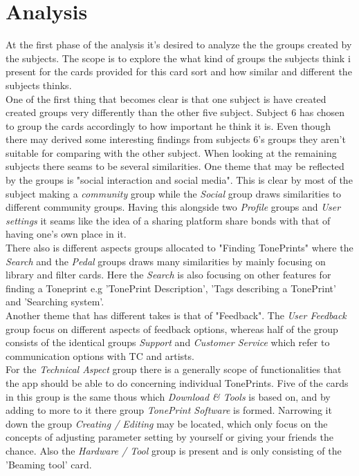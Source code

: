\section{Analysis}
\label{Analysis}
%
At the first phase of the analysis it's desired to analyze the the groups created by the subjects. The scope is to explore the what kind of groups the subjects think i present for the cards provided for this card sort and how similar and different the subjects thinks.\\  
One of the first thing that becomes clear is that one subject is have created created groups very differently than the other five subject. Subject 6 has chosen to group the cards accordingly to how important he think it is. Even though there may derived some interesting findings from subjects 6's groups they aren't suitable for comparing with the other subject. When looking at the remaining subjects there seams to be several similarities. One  theme that may be reflected by the groups is "social interaction and social media". This is clear by most of the subject making a \textit{community} group while the \textit{Social} group draws similarities to different community groups. Having this alongside two \textit{Profile} groups and \textit{User settings} it seams like the idea of a sharing platform share bonds with that of having one's own place in it.  \\
There also is different aspects groups allocated to "Finding TonePrints" where the \textit{Search} and the \textit{Pedal} groups draws many similarities by mainly focusing on library and filter cards. Here the \textit{Search} is also focusing on other features for finding a Toneprint e.g 'TonePrint Description', 'Tags describing a TonePrint' and 'Searching system'.  \\
Another theme that has different takes is that of "Feedback". The \textit{User Feedback} group focus on different aspects of feedback options, whereas half of the group consists of the identical groups \textit{Support} and \textit{Customer Service} which refer to communication options with TC and artists. \\
For the \textit{Technical Aspect} group there is a generally scope of functionalities that the app should be able to do concerning individual TonePrints. Five of the cards in this group is the same thous which \textit{Download \& Tools} is based on, and by adding to more to it there group \textit{TonePrint Software} is formed. Narrowing it down the group \textit{Creating / Editing} may be located, which only focus on the concepts of adjusting parameter setting by yourself or giving your friends the chance. Also the \textit{Hardware / Tool} group is present and is only consisting of the 'Beaming tool' card.\\
